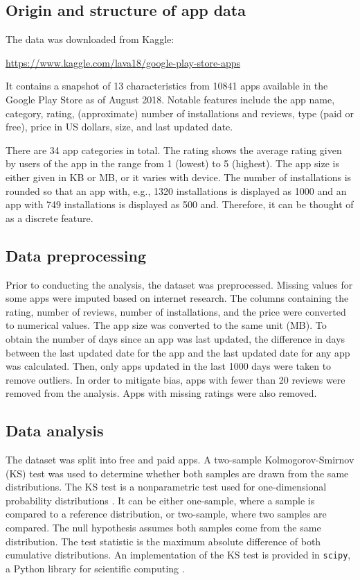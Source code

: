 \documentclass{article}
\begin{document}
\subsection{Origin and structure of app data}

The data was downloaded from Kaggle:
\begin{center}
    \url{https://www.kaggle.com/lava18/google-play-store-apps}
\end{center} It contains a snapshot of 13 characteristics from 10841 apps available in the Google Play Store as of August 2018. Notable features include the app name, category, rating, (approximate) number of installations and reviews, type (paid or free), price in US dollars, size, and last updated date. 

There are 34 app categories in total. The rating shows the average rating given by users of the app in the range from 1 (lowest) to 5 (highest). The app size is either given in KB or MB, or it varies with device. The number of installations is rounded so that an app with, e.g., 1320 installations is displayed as 1000 and an app with 749 installations is displayed as 500 and. Therefore, it can be thought of as a discrete feature.

\subsection{Data preprocessing}

Prior to conducting the analysis, the dataset was preprocessed. Missing values for some apps were imputed based on internet research. The columns containing the rating, number of reviews, number of installations, and the price were converted to numerical values. The app size was converted to the same unit (MB). To obtain the number of days since an app was last updated, the difference in days between the last updated date for the app and the last updated date for any app was calculated. Then, only apps updated in the last 1000 days were taken to remove outliers. In order to mitigate bias, apps with fewer than 20 reviews were removed from the analysis. Apps with missing ratings were also removed.

\subsection{Data analysis}

The dataset was split into free and paid apps. A two-sample Kolmogorov-Smirnov (KS) test was used to determine whether both samples are drawn from the same distributions. The KS test is a nonparametric test used for one-dimensional probability distributions \cite{kstest}. It can be either one-sample, where a sample is compared to a reference distribution, or two-sample, where two samples are compared. The null hypothesis assumes both samples come from the same distribution. The test statistic is the maximum absolute difference of both cumulative distributions. An implementation of the KS test is provided in \verb+scipy+, a Python library for scientific computing \cite{scipy}.
\end{document}
